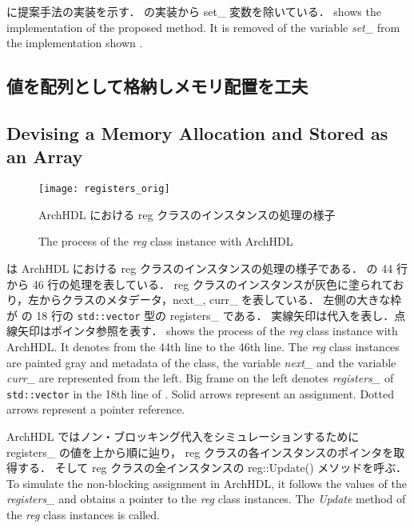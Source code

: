 に提案手法の実装を示す．
 の実装から set\_ 変数を除いている．
\fi
{} shows the implementation of the proposed method.
It is removed of the variable \textit{set\_} from the implementation shown .



\subsection{値を配列として格納しメモリ配置を工夫} \label{sss:mem_copy}
\fi
\subsection{Devising a Memory Allocation and Stored as an Array} \label{sss:mem_copy}

\begin{figure}[t]
 \centering
 \texttt{[image: registers\_orig]}
 \caption{ArchHDL における reg クラスのインスタンスの処理の様子}
\fi
 \caption{The process of the \textit{reg} class instance with ArchHDL}
 \label{fig:regs}
\end{figure}

 は ArchHDL における reg クラスのインスタンスの処理の様子である．
 の 44 行から 46 行の処理を表している．
reg クラスのインスタンスが灰色に塗られており，左からクラスのメタデータ，next\_, curr\_ を表している．
左側の大きな枠が の 18 行の \verb`std::vector` 型の registers\_ である．
実線矢印は代入を表し．点線矢印はポインタ参照を表す．
\fi
{} shows the process of the \textit{reg} class instance with ArchHDL.
It denotes  from the 44th line to the 46th line.
The \textit{reg} class instances are painted gray
and metadata of the class, the variable \textit{next\_} and the variable \textit{curr\_} are represented from the left.
Big frame on the left denotes \textit{registers\_} of \verb`std::vector` in the 18th line of .
Solid arrows represent an assignment.
Dotted arrows represent a pointer reference.

ArchHDL ではノン・ブロッキング代入をシミュレーションするために registers\_ の値を上から順に辿り，
reg クラスの各インスタンスのポインタを取得する．
そして reg クラスの全インスタンスの reg::Update() メソッドを呼ぶ．
\fi
To simulate the non-blocking assignment in ArchHDL,
it follows the values of the \textit{registers\_}
and obtains a pointer to the \textit{reg} class instances.
The \textit{Update} method of the \textit{reg} class instances is called.

